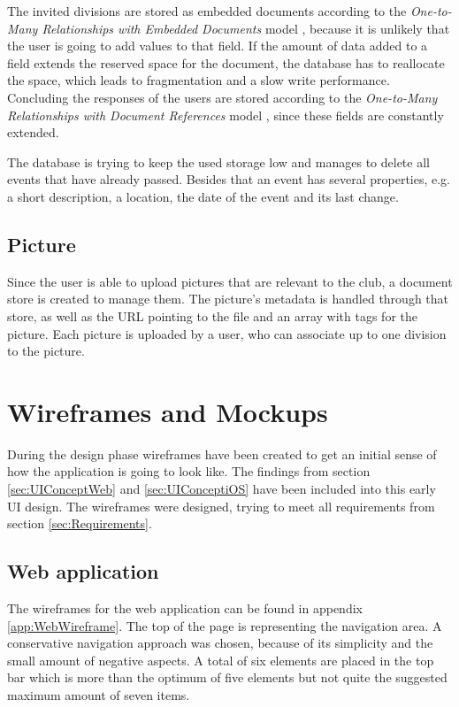 The invited divisions are stored as embedded documents according to the \emph{One-to-Many Relationships with Embedded Documents} model \cite[p. 141]{Mongo:2014aa}, because it is unlikely that the user is going to add values to that field. If the amount of data added to a field extends the reserved space for the document, the database has to reallocate the space, which leads to fragmentation and a slow write performance. Concluding the responses of the users are stored according to the \emph{One-to-Many Relationships with Document References} model \cite[p. 143]{Mongo:2014aa}, since these fields are constantly extended.

The database is trying to keep the used storage low and manages to delete all events that have already passed. Besides that an event has several properties, e.g. a short description, a location, the date of the event and its last change.

\subsection{Picture}
Since the user is able to upload pictures that are relevant to the club, a document store is created to manage them. The picture's metadata is handled through that store, as well as the URL pointing to the file and an array with tags for the picture. Each picture is uploaded by a user, who can associate up to one division to the picture.

\section{Wireframes and Mockups}
\label{sec:Wireframes}

During the design phase wireframes have been created to get an initial sense of how the application is going to look like. The findings from section \vref{sec:UIConceptWeb} and \vref{sec:UIConceptiOS} have been included into this early \gls{UI} design. The wireframes were designed, trying to meet all requirements from section \vref{sec:Requirements}.

\subsection{Web application}

The wireframes for the web application can be found in appendix \vref{app:WebWireframe}. The top of the page is representing the navigation area. A conservative navigation approach was chosen, because of its simplicity and the small amount of negative aspects. A total of six elements are placed in the top bar which is more than the optimum of five elements but not quite the suggested maximum amount of seven items.

